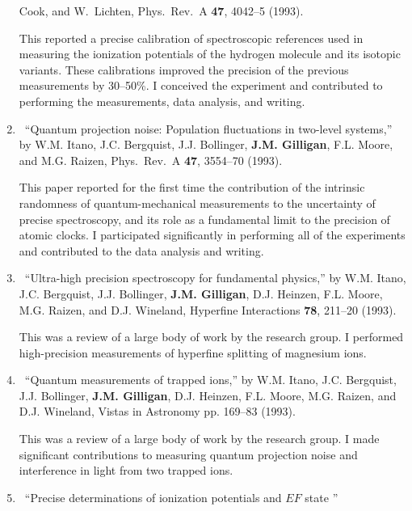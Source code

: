 \begin{enumerate}
	  Cook, and W.~Lichten, Phys.\ Rev.\ A \textbf{47}, 4042--5 (1993). 
	  \begin{credit}
	  This reported a precise calibration of spectroscopic references used in measuring the ionization potentials of the hydrogen molecule and its isotopic variants. These calibrations improved the precision of the previous measurements by 30--50\%. I conceived the experiment and contributed to performing the measurements, data analysis, and writing.
	  \end{credit}
%	
	\item
	\textdagger\ 
	\enquote{Quantum projection noise: Population fluctuations in two-level
	  systems,}  by W.M. Itano, J.C. Bergquist, J.J. Bollinger, \textbf{J.M. Gilligan},
	  F.L. Moore, and M.G. Raizen, Phys.\ Rev.\ A \textbf{47}, 3554--70 (1993). 
	  \begin{credit}
	  This paper reported for the first time the contribution of the intrinsic randomness of quantum-mechanical measurements to the uncertainty of precise spectroscopy, and its role as a fundamental limit to the precision of atomic clocks.
	  I participated significantly in performing all of the experiments and contributed to the data analysis and writing.
	  \end{credit}
%	
	\item
	\textdagger\ 
	\enquote{Ultra-high precision spectroscopy for fundamental physics,}  by W.M.
	  Itano, J.C. Bergquist, J.J. Bollinger, \textbf{J.M. Gilligan}, D.J. Heinzen, F.L.
	  Moore, M.G. Raizen, and D.J. Wineland, Hyperfine Interactions \textbf{78},
	  211--20 (1993).
	  \begin{credit}
	  This was a review of a large body of work by the research group.  
	  I performed high-precision measurements of hyperfine splitting of magnesium ions.
	  \end{credit}
%	
	\item
	\textdagger\ 
	\enquote{Quantum measurements of trapped ions,}  by W.M. Itano, J.C.
	  Bergquist, J.J. Bollinger, \textbf{J.M. Gilligan}, D.J. Heinzen, F.L. Moore, M.G.
	  Raizen, and D.J. Wineland, Vistas in Astronomy pp. 169--83 (1993). 
	  \begin{credit}
	  This was a review of a large body of work by the research group. I made significant contributions to measuring quantum projection noise and interference in light from two trapped ions.
	  \end{credit}
%	
	\item
	\textdagger\ 
	\enquote{Precise determinations of ionization potentials and {$EF$} state
}
\end{enumerate}
